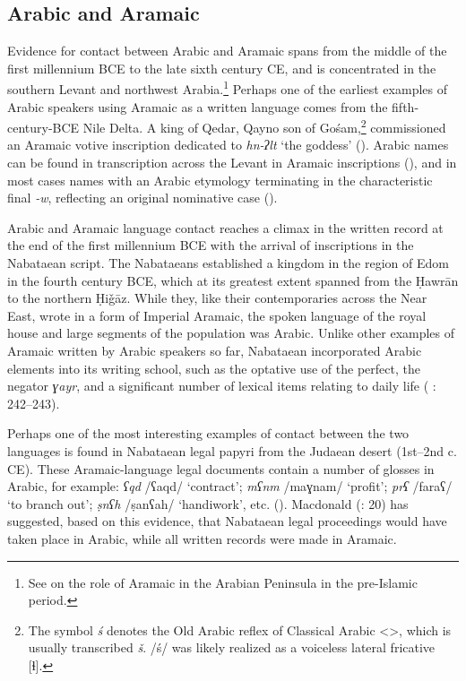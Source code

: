 \documentclass[output=paper]{langsci/langscibook}
\begin{document}
\subsection{Arabic and Aramaic}
Evidence for contact between Arabic and Aramaic spans from the middle of the first millennium BCE to the late sixth century CE, and is concentrated in the southern Levant and northwest Arabia.\footnote{See \citet{Stein2018} on the role of Aramaic in the Arabian Peninsula in the pre-Islamic period.} Perhaps one of the earliest examples of Arabic speakers using Aramaic as a written language comes from the fifth-century-BCE Nile Delta. A king of Qedar, Qayno  son of Gośam,\footnote{The symbol \textit{ś} denotes the Old Arabic reflex of Classical Arabic <{}>, which is usually transcribed \textit{š}. /ś/ was likely realized as a voiceless lateral fricative [ɬ].} commissioned an Aramaic votive inscription dedicated to \textit{hn-ʔlt} ‘the goddess’ (\citealt{Rabinowitz1956}). Arabic names can be found in transcription across the Levant in Aramaic inscriptions (\citealt{Israel1995}), and in most cases names with an Arabic etymology terminating in the characteristic final \textit{-w}, reflecting an original nominative case (\citealt{Al-Jalladforthcoming}). 

Arabic and Aramaic language contact reaches a climax in the written record at the end of the first millennium BCE with the arrival of inscriptions in the Nabataean script. The Nabataeans established a kingdom in the region of Edom in the fourth century BCE, which at its greatest extent spanned from the Ḥawrān to the northern Ḥiǧāz. While they, like their contemporaries across the Near East, wrote in a form of Imperial Aramaic, the spoken language of the royal house and large segments of the population was Arabic. Unlike other examples of Aramaic written by Arabic speakers so far, Nabataean incorporated Arabic elements into its writing school, such as the optative use of the perfect, the negator \textit{ɣayr}, and a significant number of lexical items relating to daily life (\citealt{Gzella2015} : 242--243).

Perhaps one of the most interesting examples of contact between the two languages is found in Nabataean legal papyri from the Judaean desert (1st--2nd c. CE). These Aramaic-language legal documents contain a number of glosses in Arabic, for example: \textit{ʕqd} /ʕaqd/ ‘contract’; \textit{mʕnm} /maɣnam/ ‘profit’; \textit{prʕ} /faraʕ/ ‘to branch out’; \textit{ṣnʕh} /ṣanʕah/ ‘handiwork’, etc. (\citealt{Yardeni2014}). Macdonald (\citeyear{Macdonald2010}: 20) has suggested, based on this evidence, that Nabataean legal proceedings would have taken place in Arabic, while all written records were made in Aramaic.
\end{document}
